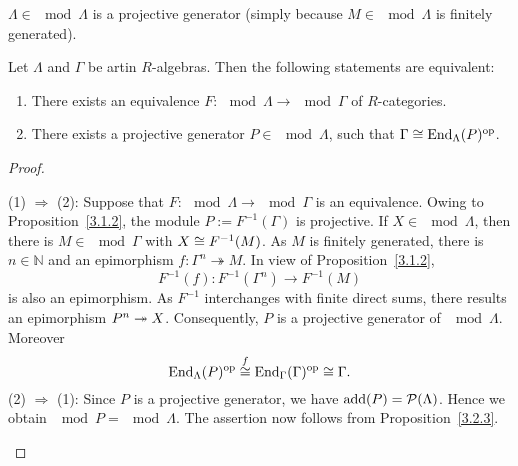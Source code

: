 \begin{example}
  $\Lambda \in \mod{\Lambda}$ is a projective generator (simply because $M \in \mod{\Lambda}$ is
  finitely generated).
\end{example}


\begin{theorem}[Morita]\label{3.2.4}
  Let $\Lambda$ and $\Gamma$ be artin $R$-algebras. Then the following statements are
  equivalent:
  \begin{enumerate}
  \item There exists an equivalence $F : \mod{\Lambda} \to \mod{\Gamma}$ of $R$-categories.
  \item There exists a projective generator $P \in \mod{\Lambda}$, such that $\Gamma
    \cong \operatorname{End}_\Lambda(P)^{\mathrm{op}}$.
  \end{enumerate}
\end{theorem}


\begin{proof}\
\begin{addmargin}[1cm]{0cm}
\hspace{-1cm}(1) $\Rightarrow$ (2): Suppose that $F : \mod{\Lambda} \to \mod{\Gamma}$ is an equivalence. Owing to Proposition~\ref{3.1.2}, the module $P := F^{-1}(\Gamma)$ is projective.
  If $X \in \mod{\Lambda}$, then there is $M \in \mod{\Gamma}$ with $X \cong F^{-1}(M)$. As $M$ is
  finitely generated, there is $n \in \mathbb{N}$ and an epimorphism
  $f: \Gamma^n \twoheadrightarrow M$. In view of Proposition~\ref{3.1.2},
    \[ F^{-1}(f) : F^{-1}(\Gamma^n) \to F^{-1}(M) \]
  is also an epimorphism. As $F^{-1}$ interchanges with finite direct sums, there
  results an epimorphism $P^n \twoheadrightarrow X$.
  Consequently, $P$ is a projective generator of $\mod{\Lambda}$. Moreover
    \[ \operatorname{End}_\Lambda(P)^{\mathrm{op}} \overset{f}{\cong} \operatorname{End}_\Gamma(\Gamma)^{\mathrm{op}} \cong \Gamma. \]
%
\hspace{-1cm}(2) $\Rightarrow$ (1): Since $P$ is a projective generator, we have $\operatorname{add}(P) =
  \mathcal{P}(\Lambda)$. Hence we obtain $\mod{P} = \mod{\Lambda}$. The assertion now follows from Proposition~\ref{3.2.3}.\qedhere
\end{addmargin}
\end{proof}


